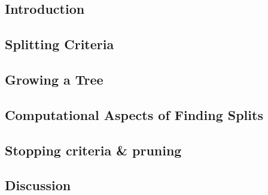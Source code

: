 

\subsection{Introduction}


\subsection{Splitting Criteria}


\subsection{Growing a Tree}


\subsection{Computational Aspects of Finding Splits}


\subsection{Stopping criteria & pruning}


\subsection{Discussion}


